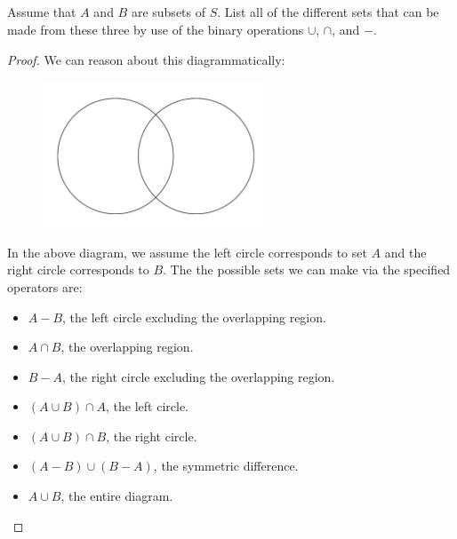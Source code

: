 \documentclass{report}
\begin{document}
\subsection{}%
\label{sub:exercise-2.18}

Assume that $A$ and $B$ are subsets of $S$.
List all of the different sets that can be made from these three by use of the
  binary operations $\cup$, $\cap$, and $-$.

\begin{proof}

  We can reason about this diagrammatically:

  \begin{figure}[ht]
    \includegraphics[width=0.6\textwidth]{venn-diagram}
    \centering
  \end{figure}

  In the above diagram, we assume the left circle corresponds to set $A$ and the
    right circle corresponds to $B$.
  The the possible sets we can make via the specified operators are:

  \begin{itemize}
    \item $A - B$, the left circle excluding the overlapping region.
    \item $A \cap B$, the overlapping region.
    \item $B - A$, the right circle excluding the overlapping region.
    \item $(A \cup B) \cap A$, the left circle.
    \item $(A \cup B) \cap B$, the right circle.
    \item $(A - B) \cup (B - A)$, the symmetric difference.
    \item $A \cup B$, the entire diagram.
  \end{itemize}

\end{proof}

\subsection{}%
\label{sub:exercise-2.19}
\end{document}
